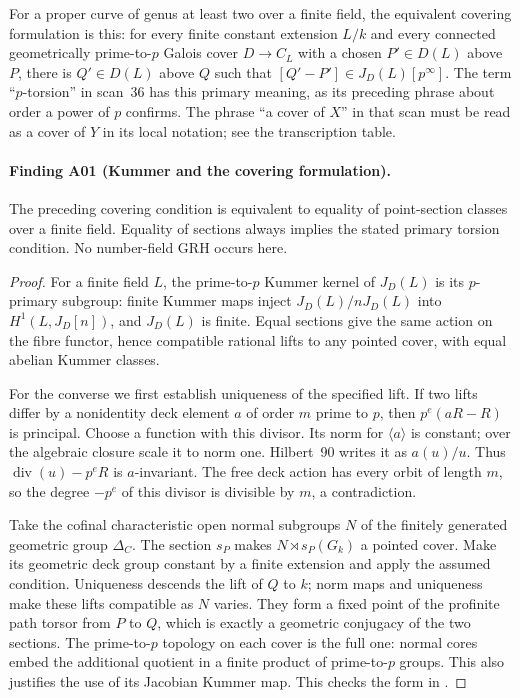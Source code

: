 \documentclass[11pt,a4paper]{article}
\begin{document}
For a proper curve of genus at least two over a finite field, the equivalent
covering formulation is this: for every finite constant extension $L/k$
and every connected geometrically prime-to-$p$ Galois cover $D\to C_L$
with a chosen $P'\in D(L)$ above $P$, there is $Q'\in D(L)$ above $Q$
such that $[Q'-P']\in J_D(L)[p^\infty]$. The term ``$p$-torsion'' in
scan~36 has this primary meaning, as its preceding phrase about order a
power of $p$ confirms. The phrase ``a cover of $X$'' in that scan must be
read as a cover of $Y$ in its local notation; see the transcription table.

\paragraph{Finding A01 (Kummer and the covering formulation).}
The preceding covering condition is equivalent to equality of point-section
classes over a finite field. Equality of sections always implies the
stated primary torsion condition. No number-field GRH occurs here.

\begin{proof}
For a finite field $L$, the prime-to-$p$ Kummer kernel of $J_D(L)$ is its
$p$-primary subgroup: finite Kummer maps inject $J_D(L)/nJ_D(L)$ into
$H^1(L,J_D[n])$, and $J_D(L)$ is finite. Equal sections give the same
action on the fibre functor, hence compatible rational lifts to any
pointed cover, with equal abelian Kummer classes.

For the converse we first establish uniqueness of the specified lift.
If two lifts differ by a nonidentity deck element $a$ of order $m$ prime
to $p$, then $p^e(aR-R)$ is principal. Choose a function with this
divisor. Its norm for $\langle a\rangle$ is constant; over the algebraic
closure scale it to norm one. Hilbert~90 writes it as $a(u)/u$.
Thus $\operatorname{div}(u)-p^eR$ is $a$-invariant. The free deck action
has every orbit of length $m$, so the degree $-p^e$ of this divisor is
divisible by $m$, a contradiction.

Take the cofinal characteristic open normal subgroups $N$ of the finitely
generated geometric group $\Delta_C$. The section $s_P$ makes
$N\rtimes s_P(G_k)$ a pointed cover. Make its geometric deck group
constant by a finite extension and apply the assumed condition.
Uniqueness descends the lift of $Q$ to $k$; norm maps and uniqueness
make these lifts compatible as $N$ varies. They form a fixed point of
the profinite path torsor from $P$ to $Q$, which is exactly a geometric
conjugacy of the two sections. The prime-to-$p$ topology on each cover
is the full one: normal cores embed the additional quotient in a finite
product of prime-to-$p$ groups. This also justifies the use of its
Jacobian Kummer map. This checks the form in \cite[A.31]{A1run}.
\end{proof}
\end{document}
